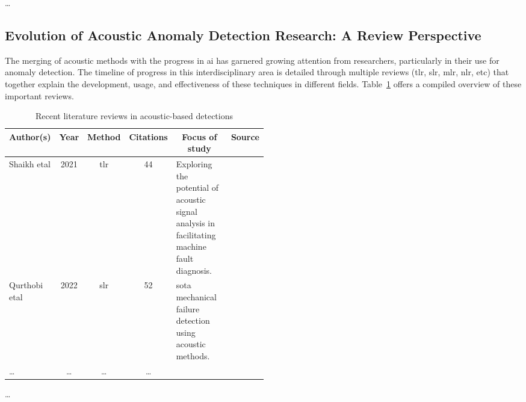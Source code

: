 \dots

\subsection{Evolution of Acoustic Anomaly Detection Research: A Review Perspective} \label{sec:evo_and}
The merging of acoustic methods with the progress in \gls{ai} has garnered growing attention from researchers, particularly in their use for anomaly detection. The timeline of progress in this interdisciplinary area is detailed through multiple reviews (\gls{tlr}, \gls{slr}, \gls{mlr}, \gls{nlr}, \gls{etc}) that together explain the development, usage, and effectiveness of these techniques in different fields. Table~\ref{tab:recent_literature_reviews} offers a compiled overview of these important reviews.

\begin{table}[!ht]
	\centering
	\caption{Recent literature reviews in acoustic-based detections}
	\label{tab:recent_literature_reviews}
    \small
	\begin{tabular}{p{0.175\linewidth}cccp{0.325\linewidth}c}
		\toprule
		\multicolumn{1}{c}{Author(s)}&Year&\multicolumn{1}{c}{Method}&Citations&\multicolumn{1}{c}{Focus of study}&Source\\
		\midrule
		Shaikh \gls{etal} &2021 & \gls{tlr} & 44 & Exploring the potential of acoustic signal analysis in facilitating machine fault diagnosis.&\cite{Shaikh2021}\\
		\hline
		Qurthobi \gls{etal} &2022& \gls{slr} & 52 & \Gls{sota} mechanical failure detection using acoustic methods.&\cite{Qurthobi2022}\\
		\hline
		\dots& \dots & \dots & \dots\\
		\bottomrule
	\end{tabular}
\end{table}
\dots
